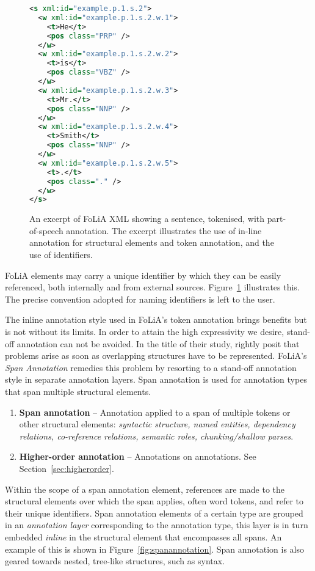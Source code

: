 \documentclass[a4paper,10pt,twoside]{article}
\begin{document}
\begin{figure}[tbh]
\begin{lstlisting}[language=xml]
<s xml:id="example.p.1.s.2">
  <w xml:id="example.p.1.s.2.w.1">
    <t>He</t>
    <pos class="PRP" />
  </w>
  <w xml:id="example.p.1.s.2.w.2">
    <t>is</t>
    <pos class="VBZ" />
  </w>
  <w xml:id="example.p.1.s.2.w.3">
    <t>Mr.</t>
    <pos class="NNP" />
  </w>
  <w xml:id="example.p.1.s.2.w.4">
    <t>Smith</t>
    <pos class="NNP" />
  </w>
  <w xml:id="example.p.1.s.2.w.5">
    <t>.</t>
    <pos class="." />
  </w>
</s>
\end{lstlisting}
\caption{An excerpt of FoLiA XML showing a sentence, tokenised, with
part-of-speech annotation. The excerpt illustrates the use of in-line annotation for
structural elements and token annotation, and the use of identifiers.\label{fig:tokenannotation}}
\end{figure}

FoLiA elements may carry a unique identifier by which they can be easily
referenced, both internally and from external sources.
Figure~\ref{fig:tokenannotation} illustrates this. The precise convention
adopted for naming identifiers is left to the user.

The inline annotation style used in FoLiA's token annotation brings benefits
but is not without its limits. In order to attain the high expressivity we
desire, stand-off annotation can not be avoided. In the title of their study,
 rightly posit that problems arise as soon as overlapping
structures have to be represented. FoLiA's \emph{Span Annotation} remedies
this problem by resorting to a stand-off annotation style in separate
annotation layers. Span annotation is used for annotation types that span
multiple structural elements.

\begin{enumerate}
\setcounter{enumi}{\theenumTemptwo}
\item \textbf{Span annotation} -- 
Annotation applied to a span of multiple tokens or other structural elements:
\emph{syntactic structure, named entities, dependency relations, co-reference
relations, semantic roles, chunking/shallow parses}.
\item \textbf{Higher-order annotation} -- Annotations on annotations. See Section~\ref{sec:higherorder}.
\end{enumerate}


Within the scope of a span annotation element, references are made to the
structural elements over which the span applies, often word tokens,
and refer to their unique identifiers. Span annotation elements of a certain
type are grouped in an \emph{annotation layer} corresponding to the annotation
type, this layer is in turn embedded \emph{inline} in the structural element
that encompasses all spans. An example of this is shown in
Figure~\ref{fig:spanannotation}. Span annotation is also geared towards nested,
tree-like structures, such as syntax.
\end{document}
